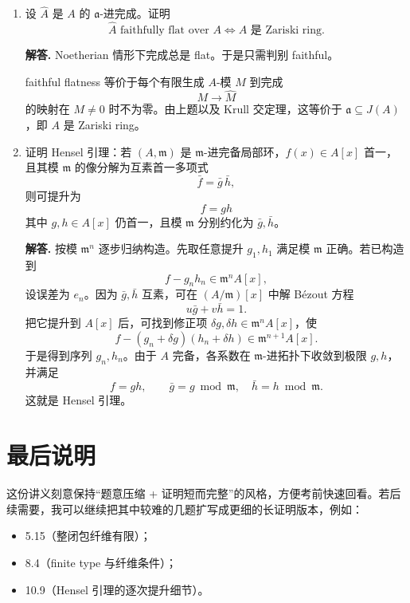 \documentclass[a4paper]{ctexart}
\begin{document}
\begin{enumerate}[leftmargin=*, label=\textbf{10.\arabic*.}]
反之若某极大理想 \(\mathfrak m\) 不含 \(\mathfrak a\)，取 \(a\in \mathfrak a\setminus \mathfrak m\)，则 \(a\) 在 \(A/\mathfrak m\) 中为单位，故 \(\mathfrak a^n+\mathfrak m=A\) 对所有 \(n\) 成立，于是 \(\mathfrak m\) 的闭包是整个环，不闭。故若每个极大理想都闭，则 \(\mathfrak a\subseteq J(A)\)。

\setcounter{enumi}{6}
\item 设 \(\widehat A\) 是 \(A\) 的 \(\mathfrak a\)-进完成。证明
\[
\widehat A \text{ faithfully flat over } A
\Longleftrightarrow
A \text{ 是 Zariski ring}.
\]

\textbf{解答.}
Noetherian 情形下完成总是 flat。于是只需判别 faithful。

faithful flatness 等价于每个有限生成 \(A\)-模 \(M\) 到完成
\[
M\to \widehat M
\]
的映射在 \(M\ne 0\) 时不为零。由上题以及 Krull 交定理，这等价于 \(\mathfrak a\subseteq J(A)\)，即 \(A\) 是 Zariski ring。

\setcounter{enumi}{8}
\item 证明 Hensel 引理：若 \((A,\mathfrak m)\) 是 \(\mathfrak m\)-进完备局部环，\(f(x)\in A[x]\) 首一，且其模 \(\mathfrak m\) 的像分解为互素首一多项式
\[
\bar f=\bar g\,\bar h,
\]
则可提升为
\[
f=gh
\]
其中 \(g,h\in A[x]\) 仍首一，且模 \(\mathfrak m\) 分别约化为 \(\bar g,\bar h\)。

\textbf{解答.}
按模 \(\mathfrak m^n\) 逐步归纳构造。先取任意提升 \(g_1,h_1\) 满足模 \(\mathfrak m\) 正确。若已构造到
\[
f-g_n h_n \in \mathfrak m^n A[x],
\]
设误差为 \(e_n\)。因为 \(\bar g,\bar h\) 互素，可在 \((A/\mathfrak m)[x]\) 中解 Bézout 方程
\[
u\bar g + v\bar h =1.
\]
把它提升到 \(A[x]\) 后，可找到修正项 \(\delta g,\delta h\in \mathfrak m^nA[x]\)，使
\[
f-(g_n+\delta g)(h_n+\delta h)\in \mathfrak m^{n+1}A[x].
\]
于是得到序列 \(g_n,h_n\)。由于 \(A\) 完备，各系数在 \(\mathfrak m\)-进拓扑下收敛到极限 \(g,h\)，并满足
\[
f=gh,\qquad \bar g=g\bmod \mathfrak m,\quad \bar h=h\bmod \mathfrak m.
\]
这就是 Hensel 引理。
\end{enumerate}

\section*{最后说明}
{}

这份讲义刻意保持“题意压缩 + 证明短而完整”的风格，方便考前快速回看。若后续需要，我可以继续把其中较难的几题扩写成更细的长证明版本，例如：
\begin{itemize}
  \item 5.15（整闭包纤维有限）；
  \item 8.4（finite type 与纤维条件）；
  \item 10.9（Hensel 引理的逐次提升细节）。
\end{itemize}
\end{document}
